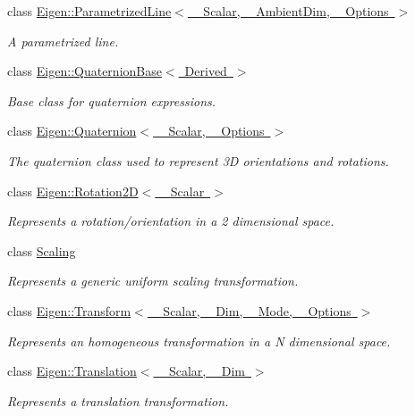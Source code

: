 \begin{DoxyCompactItemize}
class \mbox{\hyperlink{class_eigen_1_1_parametrized_line}{Eigen\+::\+Parametrized\+Line$<$ \+\_\+\+Scalar, \+\_\+\+Ambient\+Dim, \+\_\+\+Options $>$}}
\begin{DoxyCompactList}\small\item\em A parametrized line. \end{DoxyCompactList}\item 
class \mbox{\hyperlink{class_eigen_1_1_quaternion_base}{Eigen\+::\+Quaternion\+Base$<$ Derived $>$}}
\begin{DoxyCompactList}\small\item\em Base class for quaternion expressions. \end{DoxyCompactList}\item 
class \mbox{\hyperlink{class_eigen_1_1_quaternion}{Eigen\+::\+Quaternion$<$ \+\_\+\+Scalar, \+\_\+\+Options $>$}}
\begin{DoxyCompactList}\small\item\em The quaternion class used to represent 3D orientations and rotations. \end{DoxyCompactList}\item 
class \mbox{\hyperlink{class_eigen_1_1_rotation2_d}{Eigen\+::\+Rotation2\+D$<$ \+\_\+\+Scalar $>$}}
\begin{DoxyCompactList}\small\item\em Represents a rotation/orientation in a 2 dimensional space. \end{DoxyCompactList}\item 
class \mbox{\hyperlink{class_scaling}{Scaling}}
\begin{DoxyCompactList}\small\item\em Represents a generic uniform scaling transformation. \end{DoxyCompactList}\item 
class \mbox{\hyperlink{class_eigen_1_1_transform}{Eigen\+::\+Transform$<$ \+\_\+\+Scalar, \+\_\+\+Dim, \+\_\+\+Mode, \+\_\+\+Options $>$}}
\begin{DoxyCompactList}\small\item\em Represents an homogeneous transformation in a N dimensional space. \end{DoxyCompactList}\item 
class \mbox{\hyperlink{class_eigen_1_1_translation}{Eigen\+::\+Translation$<$ \+\_\+\+Scalar, \+\_\+\+Dim $>$}}
\begin{DoxyCompactList}\small\item\em Represents a translation transformation. \end{DoxyCompactList}\end{DoxyCompactItemize}
